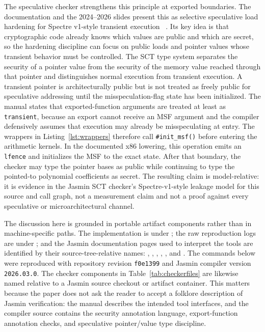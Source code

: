 \documentclass[10pt,twocolumn]{article}
\newcommand{\jasmin}{Jasmin}
\begin{document}
The speculative checker strengthens this principle at exported boundaries.  The
documentation and the 2024--2026 slides present this as selective speculative
load hardening for Spectre v1-style transient execution
~\cite{JasminCourse2024,JasminFramework2026}.  Its key idea is that
cryptographic code already knows which values are public and which are secret,
so the hardening discipline can focus on public loads and pointer values whose
transient behavior must be controlled.  The SCT type system separates the
security of a pointer value from the security of the memory value reached
through that pointer and distinguishes normal execution from transient
execution.  A transient pointer is
architecturally public but is not treated as freely public for speculative
addressing until the misspeculation-flag state has been initialized.  The
manual states that exported-function arguments are treated at least as
\texttt{transient}, because an export cannot receive an MSF argument and the
compiler defensively assumes that execution may already be misspeculating at
entry.  The wrappers in Listing~\ref{lst:wrappers} therefore call
\texttt{\#init\_msf()} before entering the arithmetic kernels.  In the documented
x86 lowering, this operation emits an \texttt{lfence} and initializes the MSF to
the exact state.  After that boundary, the checker may type the pointer bases as
public while continuing to type the pointed-to polynomial coefficients as
secret.  The resulting claim is model-relative: it is evidence in the
\jasmin{} SCT checker's Spectre-v1-style leakage model for this source and call
graph, not a measurement claim and not a proof against every speculative or
microarchitectural channel.

The discussion here is grounded in portable artifact components rather than in
machine-specific paths.  The implementation is under ; the raw
reproduction logs are under ; and the \jasmin{}
documentation pages used to interpret the tools are identified by their
source-tree-relative names:
, ,
, ,
, and
.  The commands below were reproduced
with repository revision \texttt{f0e1399} and \jasmin{} compiler version
\texttt{2026.03.0}.  The checker components in
Table~\ref{tab:checkerfiles} are likewise named relative to a \jasmin{} source
checkout or artifact container.  This matters because the paper does not ask
the reader to accept a folklore description of \jasmin{} verification: the
manual describes the intended tool interfaces, and the compiler source contains
the security annotation language, export-function annotation checks, and
speculative pointer/value type discipline.
\end{document}
